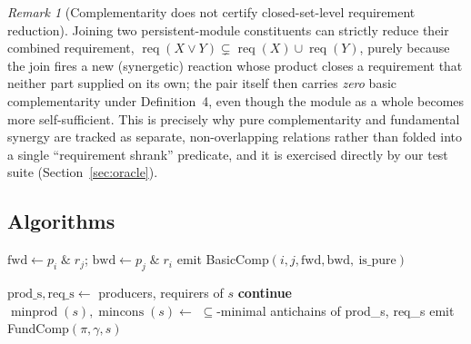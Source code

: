 \documentclass[11pt]{article}
\theoremstyle{plain}
\theoremstyle{remark}
\newtheorem{remark}{Remark}
\newcommand{\req}{\operatorname{req}}
\newcommand{\minprod}{\operatorname{minprod}}
\newcommand{\mincons}{\operatorname{mincons}}
\newcommand{\E}{\mathcal{E}}
\newcommand{\js}{\vee}
\begin{document}
\begin{remark}[Complementarity does not certify closed-set-level requirement
reduction]
\label{rem:gold2}
Joining two persistent-module constituents can strictly reduce their
combined requirement, $\req(X\js Y)\subsetneq\req(X)\cup\req(Y)$, purely
because the join fires a new (synergetic) reaction whose product closes a
requirement that neither part supplied on its own; the pair itself then
carries \emph{zero} basic complementarity under Definition~4, even though
the module as a whole becomes more self-sufficient. This is precisely why
pure complementarity and fundamental synergy are tracked as separate,
non-overlapping relations rather than folded into a single ``requirement
shrank'' predicate, and it is exercised directly by our test suite
(Section~\ref{sec:oracle}).
\end{remark}

\subsection{Algorithms}

\begin{algorithm}[t]
\caption{ComputeBasicComplementarity($\E$, hier)}\label{alg:basic_comp}
\begin{algorithmic}[1]
  \State $\text{fwd} \leftarrow p_i \;\&\; r_j$; \quad
         $\text{bwd} \leftarrow p_j \;\&\; r_i$
    \State emit BasicComp$(i, j, \text{fwd}, \text{bwd},\ \text{is\_pure})$
  \EndIf
\EndFor
\end{algorithmic}
\end{algorithm}

\begin{algorithm}[t]
\caption{ComputeFundamentalComplementarity($\E$)}\label{alg:fund_comp}
\begin{algorithmic}[1]
  \State $\text{prod\_s}, \text{req\_s} \leftarrow$ producers, requirers of $s$
    \State \textbf{continue}
  \EndIf
  \State $\minprod(s), \mincons(s) \leftarrow$ $\subseteq$-minimal antichains of prod\_s, req\_s
  \For{$\pi \in \minprod(s)$, $\gamma \in \mincons(s)$, $\pi \neq \gamma$}
    \State emit FundComp$(\pi, \gamma, s)$
  \EndFor
\EndFor
\end{algorithmic}
\end{algorithm}
\end{document}
